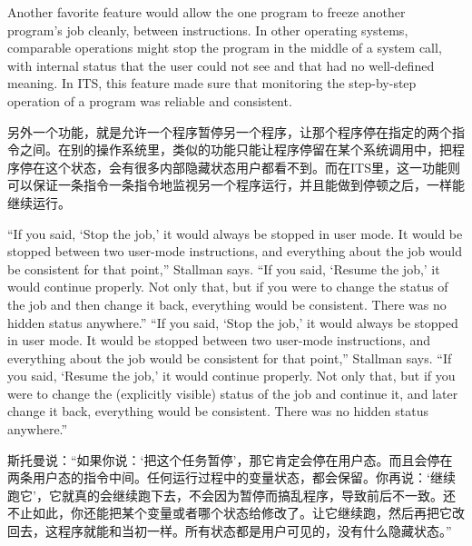 \ifdefined\vtwo
\ifdefined\eng
Another favorite feature would allow the one program to freeze another program's job cleanly, between instructions. In other operating systems, comparable operations might stop the program in the middle of a system call, with internal status that the user could not see and that had no well-defined meaning. In ITS, this feature made sure that monitoring the step-by-step operation of a program was reliable and consistent.
\fi

\ifdefined\chs
另外一个功能，就是允许一个程序暂停另一个程序，让那个程序停在指定的两个指令之间。在别的操作系统里，类似的功能只能让程序停留在某个系统调用中，把程序停在这个状态，会有很多内部隐藏状态用户都看不到。而在ITS里，这一功能则可以保证一条指令一条指令地监视另一个程序运行，并且能做到停顿之后，一样能继续运行。
\fi
\fi

\ifdefined\eng
\ifdefined\vone
``If you said, `Stop the job,' it would always be stopped in user mode. It would be stopped between two user-mode instructions, and everything about the job would be consistent for that point,'' Stallman says. ``If you said, `Resume the job,' it would continue properly. Not only that, but if you were to change the status of the job and then change it back, everything would be consistent. There was no hidden status anywhere.''
\fi
\ifdefined\vtwo
``If you said, `Stop the job,' it would always be stopped in user mode. It would be stopped between two user-mode instructions, and everything about the job would be consistent for that point,'' Stallman says. ``If you said, `Resume the job,' it would continue properly. Not only that, but if you were to change the (explicitly visible) status of the job and continue it, and later change it back, everything would be consistent. There was no hidden status anywhere.''
\fi
\fi

\ifdefined\chs
斯托曼说：``如果你说：`把这个任务暂停'，那它肯定会停在用户态。而且会停在两条用户态的指令中间。任何运行过程中的变量状态，都会保留。你再说：`继续跑它'，它就真的会继续跑下去，不会因为暂停而搞乱程序，导致前后不一致。还不止如此，你还能把某个变量或者哪个状态给修改了。让它继续跑，然后再把它改回去，这程序就能和当初一样。所有状态都是用户可见的，没有什么隐藏状态。''
\fi

